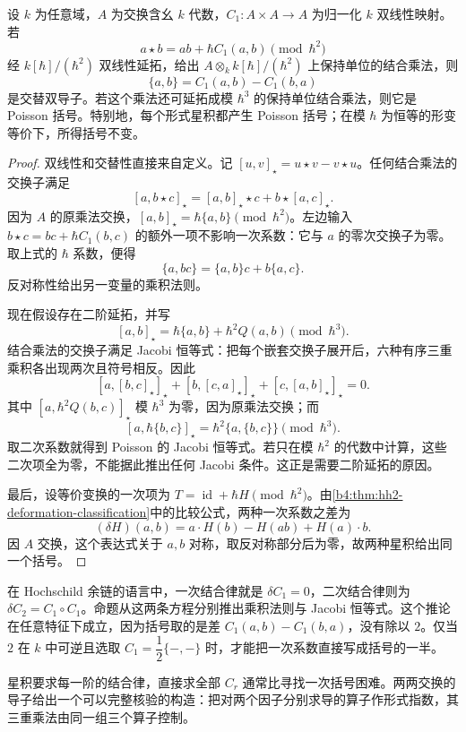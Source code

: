 \begin{proposition}\label{b4:prop:star-first-commutator-poisson}
	设 \(k\) 为任意域，\(A\) 为交换含幺 \(k\) 代数，\(C_1:A\times A\to A\) 为归一化 \(k\) 双线性映射。若
	\[
		a\star b=ab+\hbar C_1(a,b)\pmod{\hbar^2}
	\]
	经 \(k[\hbar]/(\hbar^2)\) 双线性延拓，给出 \(A\otimes_k k[\hbar]/(\hbar^2)\) 上保持单位的结合乘法，则
	\[
		\{a,b\}=C_1(a,b)-C_1(b,a)
	\]
	是交替双导子。若这个乘法还可延拓成模 \(\hbar^3\) 的保持单位结合乘法，则它是 Poisson 括号。特别地，每个形式星积都产生 Poisson 括号；在模 \(\hbar\) 为恒等的形变等价下，所得括号不变。
\end{proposition}
\begin{proof}
	双线性和交替性直接来自定义。记 \([u,v]_{\star}=u\star v-v\star u\)。任何结合乘法的交换子满足
	\[
		[a,b\star c]_{\star}
		=[a,b]_{\star}\star c+b\star[a,c]_{\star}.
	\]
	因为 \(A\) 的原乘法交换，\([a,b]_{\star}=\hbar\{a,b\}\pmod{\hbar^2}\)。左边输入 \(b\star c=bc+\hbar C_1(b,c)\) 的额外一项不影响一次系数：它与 \(a\) 的零次交换子为零。取上式的 \(\hbar\) 系数，便得
	\[
		\{a,bc\}=\{a,b\}c+b\{a,c\}.
	\]
	反对称性给出另一变量的乘积法则。

	现在假设存在二阶延拓，并写
	\[
		[a,b]_{\star}=\hbar\{a,b\}+\hbar^2 Q(a,b)\pmod{\hbar^3}.
	\]
	结合乘法的交换子满足 Jacobi 恒等式：把每个嵌套交换子展开后，六种有序三重乘积各出现两次且符号相反。因此
	\[
		[a,[b,c]_{\star}]_{\star}
		+[b,[c,a]_{\star}]_{\star}
		+[c,[a,b]_{\star}]_{\star}=0.
	\]
	其中 \([a,\hbar^2 Q(b,c)]_{\star}\) 模 \(\hbar^3\) 为零，因为原乘法交换；而
	\[
		[a,\hbar\{b,c\}]_{\star}
		=\hbar^2\{a,\{b,c\}\}\pmod{\hbar^3}.
	\]
	取二次系数就得到 Poisson 的 Jacobi 恒等式。若只在模 \(\hbar^2\) 的代数中计算，这些二次项全为零，不能据此推出任何 Jacobi 条件。这正是需要二阶延拓的原因。

	最后，设等价变换的一次项为 \(T=\operatorname{id}+\hbar H\pmod{\hbar^2}\)。由\cref{b4:thm:hh2-deformation-classification}中的比较公式，两种一次系数之差为
	\[
		(\delta H)(a,b)=a\cdot H(b)-H(ab)+H(a)\cdot b.
	\]
	因 \(A\) 交换，这个表达式关于 \(a,b\) 对称，取反对称部分后为零，故两种星积给出同一个括号。
\end{proof}

在 Hochschild 余链的语言中，一次结合律就是 \(\delta C_1=0\)，二次结合律则为 \(\delta C_2=C_1\circ C_1\)。命题从这两条方程分别推出乘积法则与 Jacobi 恒等式。这个推论在任意特征下成立，因为括号取的是差 \(C_1(a,b)-C_1(b,a)\)，没有除以 \(2\)。仅当 \(2\) 在 \(k\) 中可逆且选取 \(C_1=\dfrac12\{-,-\}\) 时，才能把一次系数直接写成括号的一半。

\ProseParagraphBreak
星积要求每一阶的结合律，直接求全部 \(C_r\) 通常比寻找一次括号困难。两两交换的导子给出一个可以完整核验的构造：把对两个因子分别求导的算子作形式指数，其三重乘法由同一组三个算子控制。

